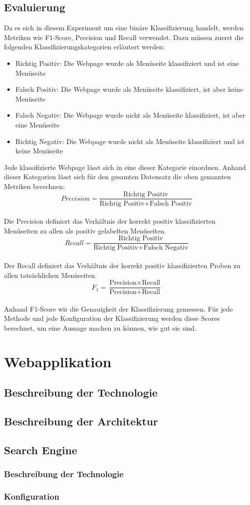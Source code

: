 \subsection{Evaluierung}
Da es sich in diesem Experiment um eine binäre Klassifizierung handelt, werden Metriken wie F1-Score, Precision und Recall verwendet.
Dazu müssen zuerst die folgenden Klassifizierungskategorien erläutert werden:
\begin{itemize}
	\item Richtig Positiv: Die Webpage wurde als Menüseite klassifiziert und ist eine Menüseite
	\item Falsch Positiv: Die Webpage wurde als Menüseite klassifiziert, ist aber keine Menüseite
	\item Falsch Negativ: Die Webpage wurde nicht als Menüseite klassifiziert, ist aber eine Menüseite
	\item Richtig Negativ: Die Webpage wurde nicht als Menüseite klassifiziert und ist keine Menüseite
\end{itemize}
Jede klassifizierte Webpage lässt sich in eine dieser Kategorie einordnen.
Anhand dieser Kategorien lässt sich für den gesamten Datensatz die oben genannten Metriken berechnen:\\
\[Precision=\frac{\text{Richtig Positiv}}{\text{Richtig Positiv} + \text{Falsch Positiv}}\]\\
Die Precision definiert das Verhältnis der korrekt positiv klassifizierten Menüseiten zu allen als positiv gelabelten Menüseiten.\\
\[Recall=\frac{\text{Richtig Positiv}}{\text{Richtig Positiv} + \text{Falsch Negativ}}\]\\
Der Recall definiert das Verhältnis der korrekt positiv klassifizierten Proben zu allen tatsächlichen Menüseiten.\\
\[F_{1}=\frac{\text{Precision} \times \text{Recall}}{\text{Precision} + \text{Recall}}\]\\
Anhand F1-Score wir die Genauigkeit der Klassifizierung gemessen.
Für jede Methode und jede Konfiguration der Klassifizierung werden diese Scores berechnet, um eine Aussage machen zu können, wie gut sie sind.
\section{Webapplikation}
\subsection{Beschreibung der Technologie}
\subsection{Beschreibung der Architektur}
\subsection{Search Engine}
\subsubsection{Beschreibung der Technologie}
\subsubsection{Konfiguration}